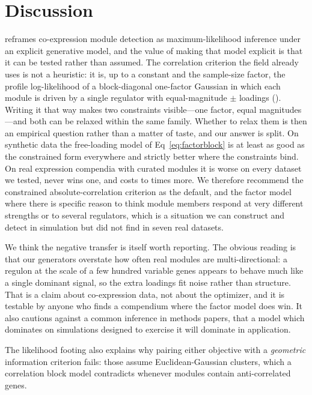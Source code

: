\section*{Discussion}
\tool{} reframes co-expression module detection as maximum-likelihood inference
under an explicit generative model, and the value of making that model explicit
is that it can be tested rather than assumed. The correlation criterion the field
already uses is not a heuristic: it is, up to a constant and the sample-size
factor, the profile log-likelihood of a block-diagonal one-factor Gaussian in
which each module is driven by a single regulator with equal-magnitude $\pm$
loadings \cite{bartholomew2011} (). Writing it that way makes
two constraints visible---one factor, equal magnitudes---and both can be relaxed
within the same family. Whether to relax them is then an empirical question
rather than a matter of taste, and our answer is split. On synthetic data the
free-loading model of Eq~\eqref{eq:factorblock} is at least as good as the
constrained form everywhere and strictly better where the constraints bind. On
real expression compendia with curated modules it is worse on every dataset we
tested, never wins one, and costs \SaelensCostRatioMin{} to \SaelensCostRatioMax{} times more. We therefore
recommend the constrained absolute-correlation criterion as the default, and the
factor model where there is specific reason to think module members respond at
very different strengths or to several regulators, which is a situation we can construct
and detect in simulation but did not find in seven real datasets.

We think the negative transfer is itself worth reporting. The obvious reading is
that our generators overstate how often real modules are multi-directional: a
regulon at the scale of a few hundred variable genes appears to behave much like
a single dominant signal, so the extra loadings fit noise rather than structure.
That is a claim about co-expression data, not about the optimizer, and it is
testable by anyone who finds a compendium where the factor model does win. It
also cautions against a common inference in methods papers, that a model which
dominates on simulations designed to exercise it will dominate in application.

The likelihood footing also explains why pairing
either objective with a \emph{geometric} information criterion fails: those assume
Euclidean-Gaussian clusters, which a correlation block model contradicts whenever
modules contain anti-correlated genes.


